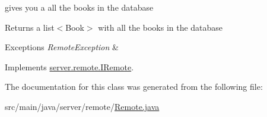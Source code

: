 gives you a all the books in the database \begin{DoxyReturn}{Returns}
a list$<$\+Book$>$ with all the books in the database 
\end{DoxyReturn}

\begin{DoxyExceptions}{Exceptions}
{\em Remote\+Exception} & \\
\hline
\end{DoxyExceptions}


Implements \hyperlink{interfaceserver_1_1remote_1_1_i_remote_ac8a764235c51eff20d635f40707e377e}{server.\+remote.\+I\+Remote}.



The documentation for this class was generated from the following file\+:\begin{DoxyCompactItemize}
\item 
src/main/java/server/remote/\hyperlink{_remote_8java}{Remote.\+java}\end{DoxyCompactItemize}
